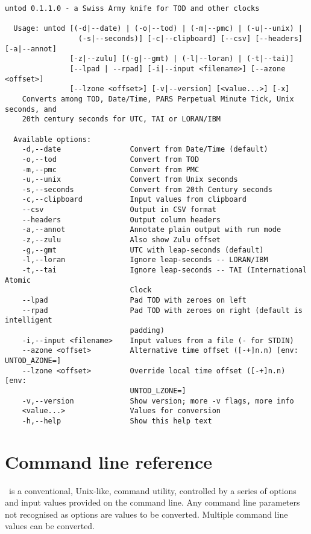 \documentclass[a4paper,12pt,oneside,openany]{memoir}
\begin{document}
\clearpage
\begin{lstlisting}[style=plain,
  basicstyle={\color{fg}\ttfamily\footnotesize},]
  untod 0.1.1.0 - a Swiss Army knife for TOD and other clocks

  Usage: untod [(-d|--date) | (-o|--tod) | (-m|--pmc) | (-u|--unix) |
                 (-s|--seconds)] [-c|--clipboard] [--csv] [--headers] [-a|--annot]
               [-z|--zulu] [(-g|--gmt) | (-l|--loran) | (-t|--tai)]
               [--lpad | --rpad] [-i|--input <filename>] [--azone <offset>]
               [--lzone <offset>] [-v|--version] [<value...>] [-x]
    Converts among TOD, Date/Time, PARS Perpetual Minute Tick, Unix seconds, and
    20th century seconds for UTC, TAI or LORAN/IBM

  Available options:
    -d,--date                Convert from Date/Time (default)
    -o,--tod                 Convert from TOD
    -m,--pmc                 Convert from PMC
    -u,--unix                Convert from Unix seconds
    -s,--seconds             Convert from 20th Century seconds
    -c,--clipboard           Input values from clipboard
    --csv                    Output in CSV format
    --headers                Output column headers
    -a,--annot               Annotate plain output with run mode
    -z,--zulu                Also show Zulu offset
    -g,--gmt                 UTC with leap-seconds (default)
    -l,--loran               Ignore leap-seconds -- LORAN/IBM
    -t,--tai                 Ignore leap-seconds -- TAI (International Atomic
                             Clock
    --lpad                   Pad TOD with zeroes on left
    --rpad                   Pad TOD with zeroes on right (default is intelligent
                             padding)
    -i,--input <filename>    Input values from a file (- for STDIN)
    --azone <offset>         Alternative time offset ([-+]n.n) [env: UNTOD_AZONE=]
    --lzone <offset>         Override local time offset ([-+]n.n) [env:
                             UNTOD_LZONE=]
    -v,--version             Show version; more -v flags, more info
    <value...>               Values for conversion
    -h,--help                Show this help text
\end{lstlisting}

\chapter{Command line reference}
\tpname\ is a conventional, Unix-like, command utility,
controlled by a series of options and input values
provided on the command line.
Any command line parameters not recognised as options
are values to be converted.
Multiple command line values can be converted.
\end{document}

